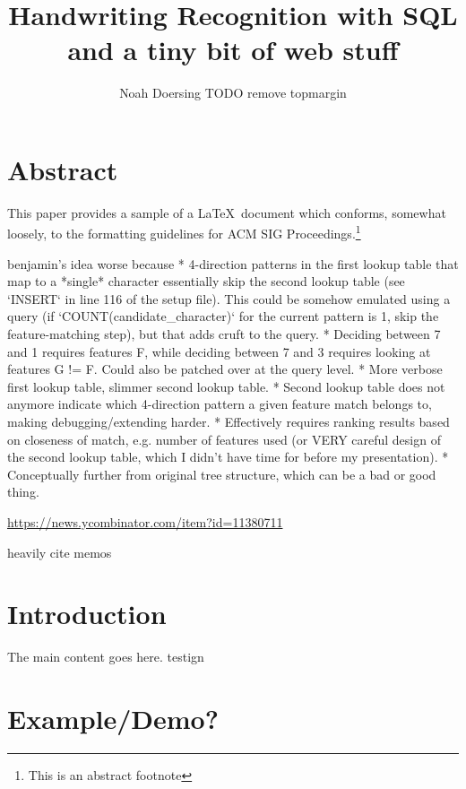 \documentclass[sigconf]{acmart}
\begin{document}
\title{Handwriting Recognition with SQL\\\hspace{6.88cm}\footnotesize and a tiny bit of web stuff}
\author{Noah Doersing TODO remove topmargin}
\affiliation{}

\maketitle

\section*{Abstract}
This paper provides a sample of a \LaTeX\ document which conforms, somewhat loosely, to the formatting guidelines for ACM SIG Proceedings.\footnote{This is an abstract footnote}

benjamin's idea worse because
* 4-direction patterns in the first lookup table that map to a *single* character essentially skip the second lookup table (see `INSERT` in line 116 of the setup file). This could be somehow emulated using a query (if `COUNT(candidate\_character)` for the current pattern is 1, skip the feature-matching step), but that adds cruft to the query.
* Deciding between 7 and 1 requires features F, while deciding between 7 and 3 requires looking at features G != F. Could also be patched over at the query level.
* More verbose first lookup table, slimmer second lookup table.
* Second lookup table does not anymore indicate which 4-direction pattern a given feature match belongs to, making debugging/extending harder.
* Effectively requires ranking results based on closeness of match, e.g. number of features used (or VERY careful design of the second lookup table, which I didn't have time for before my presentation).
* Conceptually further from original tree structure, which can be a bad or good thing.

\url{https://news.ycombinator.com/item?id=11380711}

heavily cite memos

\section{Introduction}

The main content goes here. testign

\section{Example/Demo?}
\end{document}
